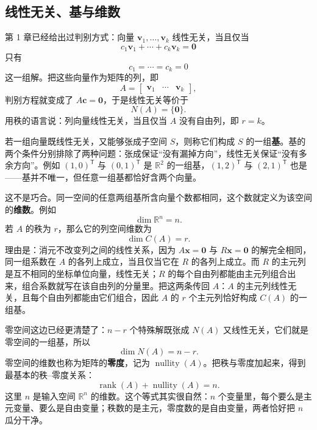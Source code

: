 \documentclass[UTF8,a4paper,12pt]{ctexart}
\numberwithin{equation}{section}
\newcommand{\R}{\mathbb{R}}
\newcommand{\trans}{^{\mathsf T}}
\begin{document}
	\subsection{线性无关、基与维数}
	
	第 1 章已经给出过判别方式：向量 $\bm{v}_1,\ldots,\bm{v}_k$ 线性无关，当且仅当
	\begin{equation}\label{eq:5.49}
	c_1\bm{v}_1+\cdots+c_k\bm{v}_k=\bm{0}
	\end{equation}
	只有
	\begin{equation}\label{eq:5.50}
	c_1=\cdots=c_k=0
	\end{equation}
	这一组解。把这些向量作为矩阵的列，即
	\begin{equation}\label{eq:5.51}
	A=
	\begin{bmatrix}
		\bm{v}_1&\cdots&\bm{v}_k
	\end{bmatrix},
	\end{equation}
	判别方程就变成了 $A\bm{c}=\bm{0}$，于是线性无关等价于
	\begin{equation}\label{eq:5.52}
	N(A)=\{\bm{0}\}.
	\end{equation}
	用秩的语言说：列向量线性无关，当且仅当 $A$ 没有自由列，即 $r=k$。
	
	若一组向量既线性无关，又能够张成子空间 $S$，则称它们构成 $S$ 的一组\textbf{基}。基的两个条件分别排除了两种问题：张成保证“没有漏掉方向”，线性无关保证“没有多余方向”。例如 $(1,0)\trans$ 与 $(0,1)\trans$ 是 $\R^2$ 的一组基，$(1,2)\trans$ 与 $(2,1)\trans$ 也是——基并不唯一，但任意一组基都恰好含两个向量。
	
	这不是巧合。同一空间的任意两组基所含向量个数都相同，这个数就定义为该空间的\textbf{维数}。例如
	\begin{equation}\label{eq:5.53}
	\dim\R^n=n.
	\end{equation}
	若 $A$ 的秩为 $r$，那么它的列空间维数为
	\begin{equation}\label{eq:5.54}
	\dim C(A)=r.
	\end{equation}
	理由是：消元不改变列之间的线性关系，因为 $A\bm{x}=\bm{0}$ 与 $R\bm{x}=\bm{0}$ 的解完全相同，同一组系数在 $A$ 的各列上成立，当且仅当它在 $R$ 的各列上成立。而 $R$ 的主元列是互不相同的坐标单位向量，线性无关；$R$ 的每个自由列都能由主元列组合出来，组合系数就写在该自由列的分量里。把这两条传回 $A$：$A$ 的主元列线性无关，且每个自由列都能由它们组合，因此 $A$ 的 $r$ 个主元列恰好构成 $C(A)$ 的一组基。
	
	零空间这边已经更清楚了：$n-r$ 个特殊解既张成 $N(A)$ 又线性无关，它们就是零空间的一组基，所以
	\begin{equation}\label{eq:5.55}
	\boxed{\dim N(A)=n-r.}
	\end{equation}
	零空间的维数也称为矩阵的\textbf{零度}，记为 $\operatorname{nullity}(A)$。把秩与零度加起来，得到最基本的秩--零度关系：
	\begin{equation}\label{eq:5.56}
	\boxed{\operatorname{rank}(A)+\operatorname{nullity}(A)=n.}
	\end{equation}
	这里 $n$ 是输入空间 $\R^n$ 的维数。这个等式其实很自然：$n$ 个变量里，每个要么是主元变量、要么是自由变量；秩数的是主元，零度数的是自由变量，两者恰好把 $n$ 瓜分干净。
	
\end{document}
